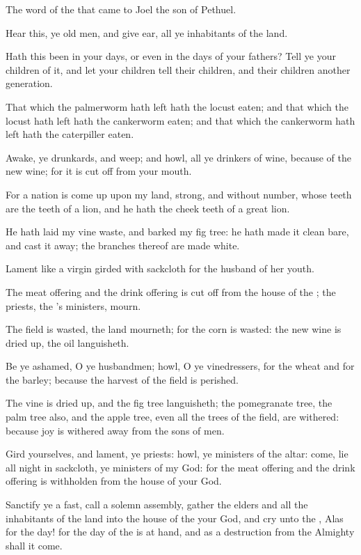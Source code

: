 \Chapter
\Verse The word of the \LORD that came to Joel the son of Pethuel.

\Verse Hear this, ye old men, and give ear, all ye inhabitants of the land.

Hath this been in your days, or even in the days of your fathers?  \Verse Tell ye your children of it, and let your children tell their children, and their children another generation.

\Verse That which the palmerworm hath left hath the locust eaten; and that which the locust hath left hath the cankerworm eaten; and that which the cankerworm hath left hath the caterpiller eaten.

\Verse Awake, ye drunkards, and weep; and howl, all ye drinkers of wine, because of the new wine; for it is cut off from your mouth.

\Verse For a nation is come up upon my land, strong, and without number, whose teeth are the teeth of a lion, and he hath the cheek teeth of a great lion.

\Verse He hath laid my vine waste, and barked my fig tree: he hath made it clean bare, and cast it away; the branches thereof are made white.

\Verse Lament like a virgin girded with sackcloth for the husband of her youth.

\Verse The meat offering and the drink offering is cut off from the house of the \LORD; the priests, the \LORD's ministers, mourn.

\Verse The field is wasted, the land mourneth; for the corn is wasted: the new wine is dried up, the oil languisheth.

\Verse Be ye ashamed, O ye husbandmen; howl, O ye vinedressers, for the wheat and for the barley; because the harvest of the field is perished.

\Verse The vine is dried up, and the fig tree languisheth; the pomegranate tree, the palm tree also, and the apple tree, even all the trees of the field, are withered: because joy is withered away from the sons of men.

\Verse Gird yourselves, and lament, ye priests: howl, ye ministers of the altar: come, lie all night in sackcloth, ye ministers of my God: for the meat offering and the drink offering is withholden from the house of your God.

\Verse Sanctify ye a fast, call a solemn assembly, gather the elders and all the inhabitants of the land into the house of the \LORD your God, and cry unto the \LORD, \Verse Alas for the day! for the day of the \LORD is at hand, and as a destruction from the Almighty shall it come.

